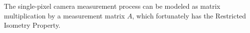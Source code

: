 The single-pixel camera measurement process can be modeled as matrix multiplication by a measurement matrix $A$, which fortunately has the Restricted Isometry Property.




